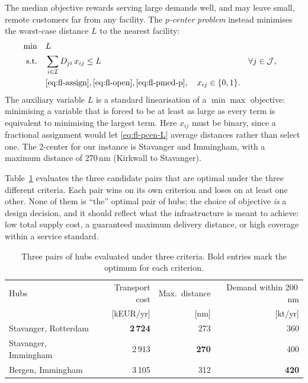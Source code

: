 The median objective rewards serving large demands well, and may leave small, remote customers far from any facility. The \emph{$p$-center problem} instead minimises the worst-case distance $L$ to the nearest facility:
\begin{align}
  \min\quad & L \label{eq:fl-pcen-obj}\\
  \text{s.t.}\quad & \sum_{i\in\mathcal{I}} D_{ji}\, x_{ij} \le L && \forall j\in\mathcal{J}, \label{eq:fl-pcen-L}\\
  & \eqref{eq:fl-assign}, \eqref{eq:fl-open}, \eqref{eq:fl-pmed-p}, \quad x_{ij}\in\{0,1\}. \nonumber
\end{align}
The auxiliary variable $L$ is a standard linearisation of a $\min\max$ objective: minimising a variable that is forced to be at least as large as every term is equivalent to minimising the largest term. Here $x_{ij}$ must be binary, since a fractional assignment would let \eqref{eq:fl-pcen-L} average distances rather than select one. The 2-center for our instance is Stavanger and Immingham, with a maximum distance of 270\,nm (Kirkwall to Stavanger).

Table~\ref{tab:fl-compare} evaluates the three candidate pairs that are optimal under the three different criteria. Each pair wins on its own criterion and loses on at least one other. None of them is ``the'' optimal pair of hubs; the choice of objective \emph{is} a design decision, and it should reflect what the infrastructure is meant to achieve: low total supply cost, a guaranteed maximum delivery distance, or high coverage within a service standard.

\begin{table}[htbp]
\centering
\caption{Three pairs of hubs evaluated under three criteria. Bold entries mark the optimum for each criterion.}
\label{tab:fl-compare}
\small
\begin{tabular}{@{}lrrr@{}}
\toprule
Hubs & Transport cost & Max.\ distance & Demand within 200\,nm \\
 & [kEUR/yr] & [nm] & [kt/yr] \\
\midrule
Stavanger, Rotterdam & \textbf{2\,724} & 273 & 360 \\
Stavanger, Immingham & 2\,913 & \textbf{270} & 400 \\
Bergen, Immingham    & 3\,105 & 312 & \textbf{420} \\
\bottomrule
\end{tabular}
\end{table}


